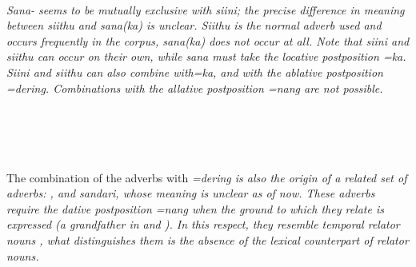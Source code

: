  \\
\em Sana- \em seems to be mutually exclusive with \em siini\em; the precise difference in meaning between \em siithu \em and \em sana(ka) \em is unclear. \em Siithu \em is the normal adverb used and occurs frequently in the corpus, \em sana(ka) \em does not occur at all. Note that \em siini \em and \em siithu \em can occur on their own, while \em sana \em must take the locative postposition \em =ka\em. \em Siini \em and \em siithu \em can also combine with\em =ka, \em and with the ablative postposition \em =dering\em. Combinations with the allative postposition \em =nang \em are not possible.


 \\
 \\

 \\
 \\
The combination of the adverbs with  \em =dering \em is also the origin of a related set of adverbs: ,  and \em sandari\em, whose meaning is unclear as of now. These adverbs require the dative postposition \em =nang \em when the ground to which they relate is expressed (a grandfather in  and ). In this respect, they resemble temporal relator nouns , what distinguishes them is the absence of the lexical counterpart of relator nouns.


